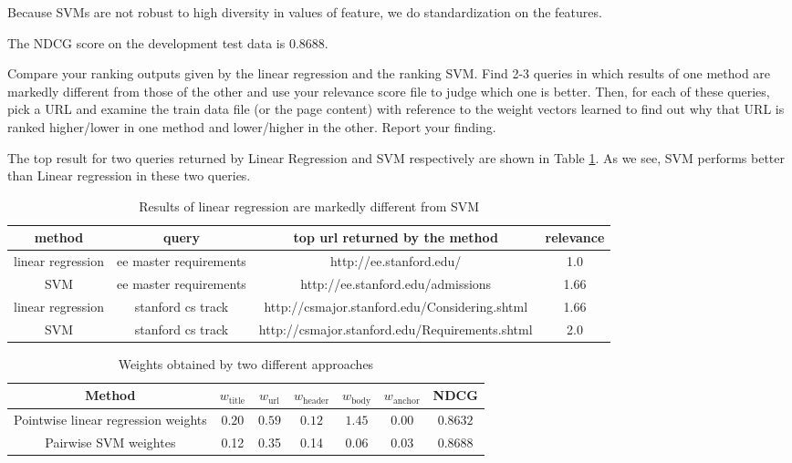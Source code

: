 Because SVMs are not robust to high diversity in values of feature, 
we do standardization on the features. 

The NDCG score on the development test data is $0.8688$.


Compare your ranking outputs given by the linear regression and the ranking SVM.
Find 2-3 queries in which results of one method are markedly different from those
of the other and use your relevance score file to judge which one is better.
Then, for each of these queries, pick a URL and examine the train data file (or the
page content) with reference to the weight vectors learned to find out why that
URL is ranked higher/lower in one method and lower/higher in the other. Report
your finding.

The top result for two queries returned by Linear Regression and SVM respectively are shown in Table \ref{tab:rel}. As we see, SVM performs better than Linear regression in these two queries. 


\begin{table}[h!]
\begin{center}
\begin{tabular}{|c|c|c|c|}
  \hline

 method & query & top url returned by the method & relevance \\  \hline
linear regression & ee master requirements &  http://ee.stanford.edu/  & 1.0 \\\hline
SVM & ee master requirements  & http://ee.stanford.edu/admissions & 1.66 \\\hline
linear regression & stanford cs track &  http://csmajor.stanford.edu/Considering.shtml &
1.66 \\\hline
SVM & stanford cs track &  http://csmajor.stanford.edu/Requirements.shtml & 2.0 \\\hline
\end{tabular}
\caption{Results of linear regression are markedly different from SVM}\label{tab:rel}
\end{center}
\end{table}

\begin{table}[h!]
\begin{center}
\begin{tabular}{|c|c|c|c|c|c|c|}
  \hline
  Method & $w_\textrm{title}$ & $w_\textrm{url}$ & $w_\textrm{header}$ & $w_\textrm{body}$ & $w_\textrm{anchor}$ & NDCG \\
  \hline
  Pointwise linear regression weights & $0.20$ & $0.59$ & $0.12$ & $1.45$ & $0.00$ & $0.8632$ \\
  \hline 
  Pairwise SVM weightes & 0.12  &  0.35 &  0.14 &  0.06 &  0.03 &  0.8688 \\
  \hline
\end{tabular}
\caption{Weights obtained by two different approaches}\label{tab:wtt}
\end{center}
\end{table}



